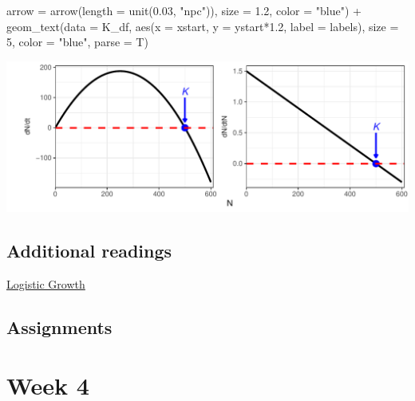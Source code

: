 \documentclass[
]{book}
\newenvironment{Shaded}{\begin{snugshade}}{\end{snugshade}}
\newcommand{\AttributeTok}[1]{\textcolor[rgb]{0.77,0.63,0.00}{#1}}
\newcommand{\DecValTok}[1]{\textcolor[rgb]{0.00,0.00,0.81}{#1}}
\newcommand{\FloatTok}[1]{\textcolor[rgb]{0.00,0.00,0.81}{#1}}
\newcommand{\FunctionTok}[1]{\textcolor[rgb]{0.00,0.00,0.00}{#1}}
\newcommand{\NormalTok}[1]{#1}
\newcommand{\SpecialCharTok}[1]{\textcolor[rgb]{0.00,0.00,0.00}{#1}}
\newcommand{\StringTok}[1]{\textcolor[rgb]{0.31,0.60,0.02}{#1}}
\begin{document}
\begin{Shaded}
\begin{Highlighting}[]
               \AttributeTok{arrow =} \FunctionTok{arrow}\NormalTok{(}\AttributeTok{length =} \FunctionTok{unit}\NormalTok{(}\FloatTok{0.03}\NormalTok{, }\StringTok{"npc"}\NormalTok{)), }
               \AttributeTok{size =} \FloatTok{1.2}\NormalTok{,}
               \AttributeTok{color =} \StringTok{"blue"}\NormalTok{) }\SpecialCharTok{+} 
  \FunctionTok{geom\_text}\NormalTok{(}\AttributeTok{data =}\NormalTok{ K\_df, }
            \FunctionTok{aes}\NormalTok{(}\AttributeTok{x =}\NormalTok{ xstart, }\AttributeTok{y =}\NormalTok{ ystart}\SpecialCharTok{*}\FloatTok{1.2}\NormalTok{, }\AttributeTok{label =}\NormalTok{ labels),}
            \AttributeTok{size =} \DecValTok{5}\NormalTok{, }
            \AttributeTok{color =} \StringTok{"blue"}\NormalTok{,}
            \AttributeTok{parse =}\NormalTok{ T)}
\end{Highlighting}
\end{Shaded}

\begin{center}\includegraphics[width=0.95\linewidth]{03_Week_3_files/figure-latex/unnamed-chunk-3-1} \end{center}

\hypertarget{additional-readings-2}{%
\section*{Additional readings}\label{additional-readings-2}}

\href{http://equation-of-the-month.blogspot.com/2012/01/logistic-growth.html}{Logistic Growth}

\hypertarget{assignments-2}{%
\section*{Assignments}\label{assignments-2}}

\hypertarget{week-4}{%
\chapter*{Week 4}\label{week-4}}
\end{document}
